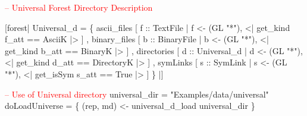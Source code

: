 \begin{code}
\textcolor{red}{-- Universal Forest Directory Description}

[forest| 
   Universal_d = 
     \{ ascii_files   [ f :: TextFile    | f <-  (GL "*"), <| get_kind  f_att == AsciiK     |> ]
     , binary_files  [ b :: BinaryFile  | b <-  (GL "*"), <| get_kind  b_att == BinaryK    |> ]
     , directories   [ d :: Universal_d | d <-  (GL "*"), <| get_kind  d_att == DirectoryK |> ]
     , symLinks      [ s :: SymLink     | s <-  (GL "*"), <| get_isSym s_att == True       |> ]
     \} 
|]
\end{code}
\begin{code}

\textcolor{red}{-- Use of Universal directory}
universal_dir = "Examples/data/universal"
doLoadUniverse =  \{
 (rep, md) <-  universal_d_load  universal_dir
 \}
\end{code}

